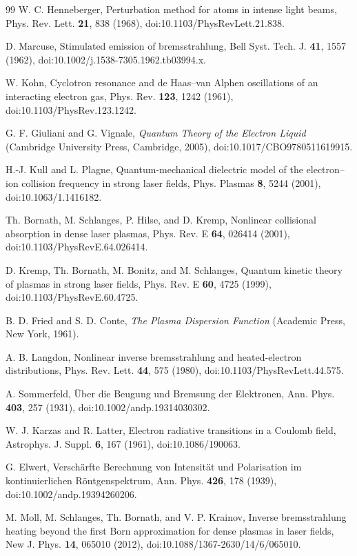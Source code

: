 \documentclass[11pt]{article}
\numberwithin{equation}{section}
\begin{document}
\begin{thebibliography}{99}
 W. C. Henneberger, Perturbation method for atoms in
intense light beams, Phys. Rev. Lett. \textbf{21}, 838 (1968),
doi:10.1103/PhysRevLett.21.838.

 D. Marcuse, Stimulated emission of bremsstrahlung, Bell
Syst. Tech. J. \textbf{41}, 1557 (1962), doi:10.1002/j.1538-7305.1962.tb03994.x.

 W. Kohn, Cyclotron resonance and de Haas--van Alphen
oscillations of an interacting electron gas, Phys. Rev. \textbf{123}, 1242
(1961), doi:10.1103/PhysRev.123.1242.

 G. F. Giuliani and G. Vignale, \emph{Quantum Theory
of the Electron Liquid} (Cambridge University Press, Cambridge, 2005),
doi:10.1017/CBO9780511619915.

 H.-J. Kull and L. Plagne, Quantum-mechanical
dielectric model of the electron--ion collision frequency in strong laser
fields, Phys. Plasmas \textbf{8}, 5244 (2001), doi:10.1063/1.1416182.

 Th. Bornath, M. Schlanges, P. Hilse, and D. Kremp,
Nonlinear collisional absorption in dense laser plasmas, Phys. Rev. E
\textbf{64}, 026414 (2001), doi:10.1103/PhysRevE.64.026414.

 D. Kremp, Th. Bornath, M. Bonitz, and M. Schlanges, Quantum
kinetic theory of plasmas in strong laser fields, Phys. Rev. E \textbf{60},
4725 (1999), doi:10.1103/PhysRevE.60.4725.

 B. D. Fried and S. D. Conte, \emph{The Plasma
Dispersion Function} (Academic Press, New York, 1961).

 A. B. Langdon, Nonlinear inverse bremsstrahlung and
heated-electron distributions, Phys. Rev. Lett. \textbf{44}, 575 (1980),
doi:10.1103/PhysRevLett.44.575.

 A. Sommerfeld, \"Uber die Beugung und Bremsung der
Elektronen, Ann. Phys. \textbf{403}, 257 (1931), doi:10.1002/andp.19314030302.

 W. J. Karzas and R. Latter, Electron radiative
transitions in a Coulomb field, Astrophys. J. Suppl. \textbf{6}, 167 (1961),
doi:10.1086/190063.

 G. Elwert, Versch\"arfte Berechnung von Intensit\"at und
Polarisation im kontinuierlichen R\"ontgenspektrum, Ann. Phys. \textbf{426},
178 (1939), doi:10.1002/andp.19394260206.

 M. Moll, M. Schlanges, Th. Bornath, and V. P. Krainov,
Inverse bremsstrahlung heating beyond the first Born approximation for dense
plasmas in laser fields, New J. Phys. \textbf{14}, 065010 (2012),
doi:10.1088/1367-2630/14/6/065010.

\end{thebibliography}
\end{document}
